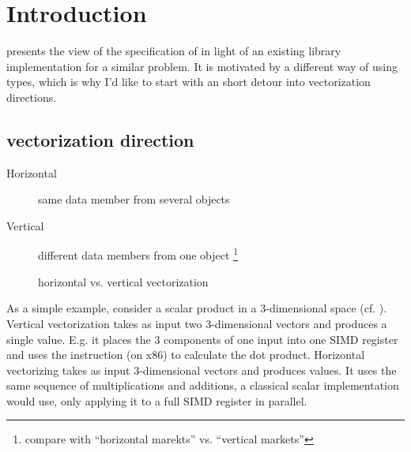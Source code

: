 \pagestyle{scrheadings}
\section{Introduction}
\textcite{P0820R0} presents the view of the  specification of \textcite{P0214R5} in light of an existing library implementation for a similar problem.
It is motivated by a different way of using \simd types, which is why I'd like to start with an short detour into vectorization directions.

\subsection{vectorization direction}
  \begin{description}
    \item[Horizontal] same data member from several objects
    \item[Vertical] different data members from one object
      \footnote{compare with “horizontal marekts” vs. “vertical markets”}
  \end{description}

  \begin{figure}
    \centering
    \caption{horizontal vs. vertical vectorization}
    \label{fig:vectorization direction}
  \end{figure}

  As a simple example, consider a scalar product in a 3-dimensional space (cf. ).
  Vertical vectorization takes as input two 3-dimensional vectors and produces a single value.
  E.g. it places the 3 components of one input into one SIMD register and uses the  instruction (on x86) to calculate the dot product.
  Horizontal vectorizing takes as input  3-dimensional vectors and produces  values.
  It uses the same sequence of multiplications and additions, a classical scalar implementation would use, only applying it to a full SIMD register in parallel.

